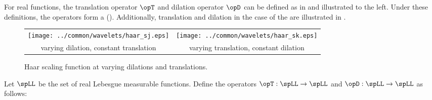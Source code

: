 \begin{minipage}[c]{8\tw/16}
For real functions, the translation operator $\opT$ and dilation operator $\opD$ 
can be defined as in  and illustrated to the left.
Under these definitions, the operators form a \vsmratext ().
Additionally, translation and dilation in the case of the 
\footnotemark
are illustrated in .
\end{minipage}

\begin{figure}[t]
\setlength{\unitlength}{8mm}
\begin{center}
\begin{tabular}{cc}
   \texttt{[image: ../common/wavelets/haar\_sj.eps]} &
   \texttt{[image: ../common/wavelets/haar\_sk.eps]} \\
   \footnotesize varying dilation, constant translation   & 
   \footnotesize varying translation, constant dilation
\end{tabular}
\caption{
   \label{fig:haar-jn}
   Haar scaling function at varying dilations and translations.
   }
\end{center}
\end{figure}

\begin{definition}
\label{def:vsmra_real_T}
\label{def:vsmra_real_D}
Let $\spLL$ be the set of real Lebesgue measurable functions.
Define the operators $\opT:\spLL\to\spLL$ and $\opD:\spLL\to\spLL$ as follows:
\end{definition}



